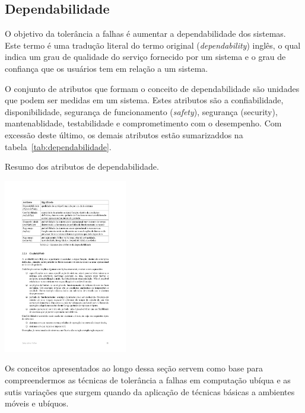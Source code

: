 \subsection{Dependabilidade} %
\label{sub:dependabilidade}

O objetivo da tolerância a falhas é aumentar a dependabilidade dos sistemas. Este termo é uma tradução literal do termo original (\emph{dependability}) inglês, o qual indica um grau de qualidade do serviço fornecido por um sistema e o grau de confiança que os usuários tem em relação a um sistema.

O conjunto de atributos que formam o conceito de dependabilidade são unidades que podem ser medidas em um sistema. Estes atributos são a confiabilidade, disponibilidade, segurança de funcionamento (\emph{safety}), segurança (security), mantenablidade, testabilidade e comprometimento com o desempenho. Com excessão deste último, os demais atributos estão sumarizaddos na tabela~\ref{tab:dependabilidade}.

\begin{table}
\begin{center}
\caption{Resumo dos atributos de dependabilidade.}\label{tab:dependabilidade}

	\includegraphics[height=3in]{figuras/tabela_weber.pdf}

\end{center}
\end{table}

Os conceitos apresentados ao longo dessa seção servem como base para compreendermos as técnicas de tolerância a falhas em computação ubíqua e as sutis variações que surgem quando da aplicação de técnicas básicas a ambientes móveis e ubíquos.